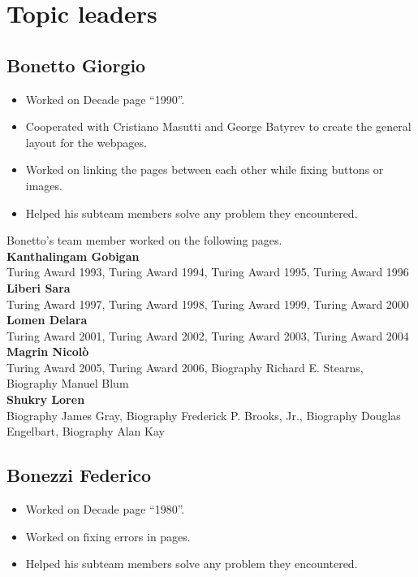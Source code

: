 \documentclass[11pt]{article}
\begin{document}
\section*{Topic leaders}

\subsection*{Bonetto Giorgio}
\begin{itemize}
 \item Worked on Decade page ``1990''.
 \item Cooperated with Cristiano Masutti and George Batyrev to create the general layout for the webpages.
 \item Worked on linking the pages between each other while fixing buttons or images.
 \item Helped his subteam members solve any problem they encountered.
\end{itemize}

\noindent Bonetto's team member worked on the following pages.\\

\noindent\textbf{Kanthalingam Gobigan}\\
Turing Award 1993, Turing Award 1994, Turing Award 1995, Turing Award 1996\\

\noindent\textbf{Liberi Sara}\\
Turing Award 1997, Turing Award 1998, Turing Award 1999, Turing Award 2000\\

\noindent\textbf{Lomen Delara}\\
Turing Award 2001, Turing Award 2002, Turing Award 2003, Turing Award 2004\\

\noindent\textbf{Magrin Nicolò}\\
Turing Award 2005, Turing Award 2006, Biography Richard E. Stearns, Biography Manuel Blum\\

\noindent\textbf{Shukry Loren}\\
Biography James Gray, Biography Frederick P. Brooks, Jr., Biography Douglas Engelbart, Biography Alan Kay\\

\subsection*{Bonezzi Federico}
\begin{itemize}
 \item Worked on Decade page ``1980''.
 \item Worked on fixing errors in pages.
 \item Helped his subteam members solve any problem they encountered.
\end{itemize}
\end{document}
